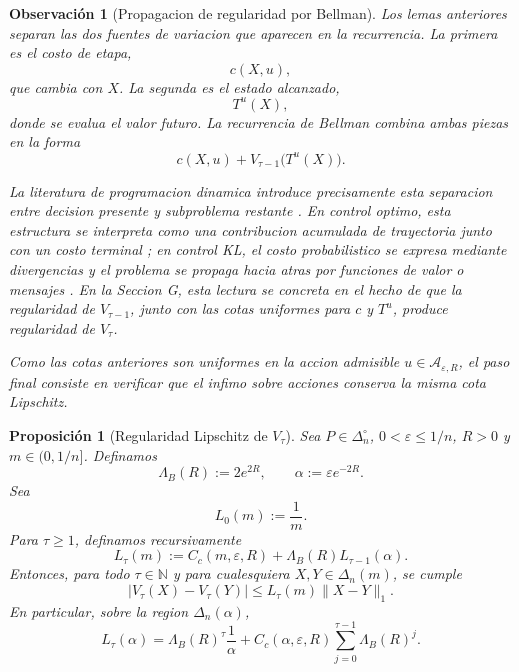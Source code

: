 ﻿\documentclass[12pt]{article}
\newtheorem{proposicion}{Proposición}[section]
\newtheorem{observacion}{Observación}[section]
\begin{document}
\begin{observacion}[Propagacion de regularidad por Bellman]\label{obs:propagacion_regularidad_bellman}
Los lemas anteriores separan las dos fuentes de variacion que aparecen en la recurrencia. La primera es el costo de etapa,
\[
c(X,u),
\]
que cambia con \(X\). La segunda es el estado alcanzado,
\[
T^u(X),
\]
donde se evalua el valor futuro. La recurrencia de Bellman combina ambas piezas en la forma
\[
c(X,u)+V_{\tau-1}\bigl(T^u(X)\bigr).
\]

La literatura de programacion dinamica introduce precisamente esta separacion entre decision presente y subproblema restante \citep{ref18}. En control optimo, esta estructura se interpreta como una contribucion acumulada de trayectoria junto con un costo terminal \citep{Kappen2005LinearTheoryForControlOfNonLinearStochasticSystems}; en control KL, el costo probabilistico se expresa mediante divergencias y el problema se propaga hacia atras por funciones de valor o mensajes \citep{KappenGomezOpper2012OptimalControlAsAGraphicalModelInferenceProblem}. En la Seccion G, esta lectura se concreta en el hecho de que la regularidad de \(V_{\tau-1}\), junto con las cotas uniformes para \(c\) y \(T^u\), produce regularidad de \(V_\tau\).

Como las cotas anteriores son uniformes en la accion admisible \(u\in\mathcal A_{\varepsilon,R}\), el paso final consiste en verificar que el infimo sobre acciones conserva la misma cota Lipschitz.
\end{observacion}

\begin{proposicion}[Regularidad Lipschitz de \(V_\tau\)]\label{prop:lipschitz_V_tau_bellman}
Sea \(P\in\Delta_n^\circ\), \(0<\varepsilon\le 1/n\), \(R>0\) y \(m\in(0,1/n]\). Definamos
\[
\Lambda_B(R):=2e^{2R},
\qquad
\alpha:=\varepsilon e^{-2R}.
\]
Sea
\[
L_0(m):=\frac1m.
\]
Para \(\tau\ge 1\), definamos recursivamente
\[
L_\tau(m)
:=
C_c(m,\varepsilon,R)
+
\Lambda_B(R)L_{\tau-1}(\alpha).
\]
Entonces, para todo \(\tau\in\mathbb N\) y para cualesquiera \(X,Y\in\Delta_n(m)\), se cumple
\[
|V_\tau(X)-V_\tau(Y)|
\le
L_\tau(m)\|X-Y\|_1.
\]
En particular, sobre la region \(\Delta_n(\alpha)\),
\[
L_\tau(\alpha)
=
\Lambda_B(R)^\tau\frac1\alpha
+
C_c(\alpha,\varepsilon,R)
\sum_{j=0}^{\tau-1}\Lambda_B(R)^j.
\]
\end{proposicion}
\end{document}
